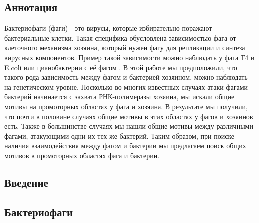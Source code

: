 \documentclass[14pt]{extarticle}
\begin{document}
%


\begin{center}
\item \section{Аннотация}
\end{center}

\par{Бактериофаги (фаги) - это вирусы, которые избирательно поражают бактериальные клетки. Такая специфика обусловлена
зависимостью фага от клеточного механизма хозяина, который нужен фагу для репликации и синтеза вирусных компонентов.
Пример такой зависимости можно наблюдать у фага Т4 и E.coli \cite{hinton} или цианобактерии с её фагом \cite{puxty-evanx}. В этой работе мы предположили, что такого рода зависимость между фагом и бактерией-хозяином, можно наблюдать на генетическом уровне. Посколько во многих известных случаях атаки фагами бактерий начинается с захвата РНК-полимеразы хозяина, мы искали общие мотивы на промоторных областях у фага и хозяина. В результате мы получили, что почти в половине случаях общие мотивы в этих областях у фагов и хозяинов есть. Также в большинстве случаях мы нашли общие мотивы между различными фагами, атакующими одни их тех же бактерий. Таким образом, при поиске наличия взаимодействия между фагом и бактерии мы предлагаем поиск общих мотивов в промоторных областях фага и бактерии.}


\newpage
\tableofcontents

\newpage
\begin{center}
\item \section{Введение}
\end{center}

    \begin{center}
    \item \subsection{Бактериофаги}
    \end{center}
    
\end{document}
